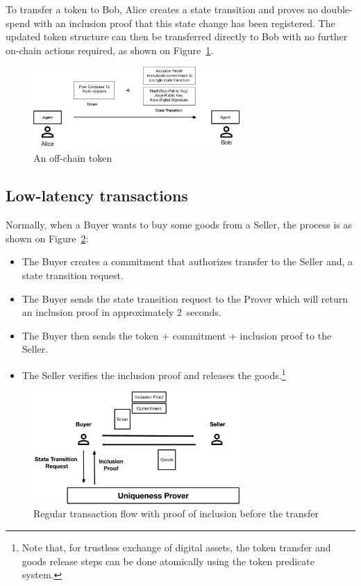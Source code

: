 \documentclass{article}
\begin{document}
To transfer a token to Bob, Alice creates a state transition and proves no double-spend with an inclusion proof that this state change has been registered. The updated token structure can then be transferred directly to Bob with no further on-chain actions required, as shown on Figure~\ref{fig:OffChain}.

\begin{figure}[H]
    \centering
    \includegraphics[width=0.7\textwidth]{OffChain.png}
    \caption{An off-chain token}
    \label{fig:OffChain}
\end{figure}

\subsection{Low-latency transactions}

Normally, when a Buyer wants to buy some goods from a Seller, the process is as shown on Figure~\ref{fig:LowLatency1}:
\begin{itemize}
  \item The Buyer creates a commitment that authorizes transfer to the Seller and, a state transition request.
  \item The Buyer sends the state transition request to the Prover which will return an inclusion proof in approximately 2~seconds.
  \item The Buyer then sends the token + commitment + inclusion proof to the Seller.
  \item The Seller verifies the inclusion proof and releases the goods.\footnote{Note that, for trustless exchange of digital assets, the token transfer and goods release steps can be done atomically using the token predicate system.}
\end{itemize}

\begin{figure}[ht]
    \centering
    \includegraphics[width=0.7\textwidth]{LowLatency1.png}
    \caption{Regular transaction flow with proof of inclusion before the transfer}
    \label{fig:LowLatency1}
\end{figure}
\end{document}
